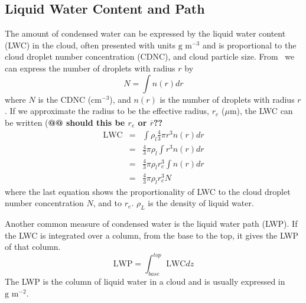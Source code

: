 \subsection{Liquid Water Content and Path}
The amount of condensed water can be expressed by the liquid water content (LWC) in the cloud, often presented with units $\text{g~m}^{-3}$ and is proportional to the cloud droplet number concentration (CDNC), and cloud particle size. From~\citet{Rogers1989} we can express the number of droplets with radius $r$ by
\begin{equation}
N = \int n(r) dr
\end{equation}
where $N$ is the CDNC ($\text{cm}^{-3}$), and $n(r)$ is the number of droplets with radius $r$. If we approximate the radius to be the effective radius, $r_e$ ($\mu\text{m}$), the LWC can be written (\textbf{@@ should this be $r_e$ or $\overline{r}$??}
\begin{eqnarray}
\text{LWC} &=& \int \rho_l \frac{4}{3} \pi r^3 n(r) dr\\
&=& \frac{4}{3} \pi \rho_l \int r^3 n(r) dr\\
&=& \frac{4}{3} \pi \rho_l r_e^3 \int n(r) dr\\
&=& \frac{4}{3} \pi \rho_l r_e^3 N 
\label{eqn:LWC}
\end{eqnarray}
where the last equation shows the proportionality of LWC to the cloud droplet number concentration $N$, and to $r_e$. $\rho_L$ is the density of liquid water.

Another common measure of condensed water is the liquid water path (LWP).
If the LWC is integrated over a column, from the base to the top, it gives the LWP of that column.
\begin{equation}
\text{LWP} = \int_{base}^{top} \text{LWC} dz
\end{equation}
The LWP is the column of liquid water in a cloud and is usually expressed in $\text{g~m}^{-2}$.

